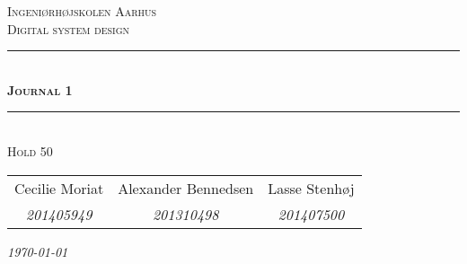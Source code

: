 
	
\newcommand{\HRule}{\rule{\linewidth}{0.1mm}} %
	
\begin{center}
	
\textsc{\LARGE Ingeniørhøjskolen Aarhus}\\[1.5cm] %

\textsc{\large Digital system design}\\[2.5cm] 
\HRule \\[0.8cm]
{\huge \bfseries \textsc{Journal 1}}\\[0.4cm]
\HRule \\[1.5cm]

\textsc{\large Hold 50}\\
\vspace{0.5 in}
\begin{tabular}{c c c}
	Cecilie Moriat &  Alexander Bennedsen & Lasse Stenhøj \\
	\textsl{201405949} & \textsl{201310498} & \textsl{201407500}
\end{tabular}

\vspace{2.5 in}

{\large\textit{\today}} \\[3cm]
\vfill %
\end{center} %


